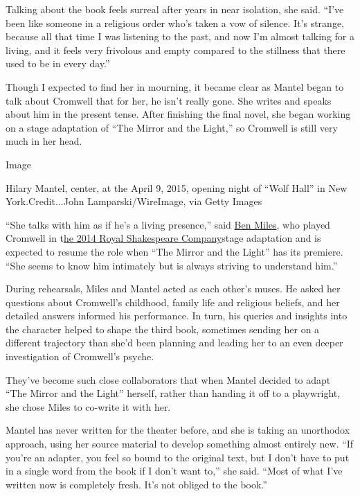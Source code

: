 Talking about the book feels surreal after years in near isolation, she
said. ``I've been like someone in a religious order who's taken a vow of
silence. It's strange, because all that time I was listening to the
past, and now I'm almost talking for a living, and it feels very
frivolous and empty compared to the stillness that there used to be in
every day.''

Though I expected to find her in mourning, it became clear as Mantel
began to talk about Cromwell that for her, he isn't really gone. She
writes and speaks about him in the present tense. After finishing the
final novel, she began working on a stage adaptation of ``The Mirror and
the Light,'' so Cromwell is still very much in her head.

Image

Hilary Mantel, center, at the April 9, 2015, opening night of ``Wolf
Hall'' in New York.Credit...John Lamparski/WireImage, via Getty Images

``She talks with him as if he's a living presence,'' said
\href{https://www.nytimes3xbfgragh.onion/2015/03/22/theater/ben-miles-takes-on-wolf-hall-onstage.html}{Ben
Miles}, who played Cromwell in
t\href{https://www.nytimes3xbfgragh.onion/2014/01/05/theater/wolf-hall-and-bring-up-the-bodies-head-for-the-stage.html}{he
2014 Royal Shakespeare Company}stage adaptation and is expected to
resume the role when ``The Mirror and the Light'' has its premiere.
``She seems to know him intimately but is always striving to understand
him.''

During rehearsals, Miles and Mantel acted as each other's muses. He
asked her questions about Cromwell's childhood, family life and
religious beliefs, and her detailed answers informed his performance. In
turn, his queries and insights into the character helped to shape the
third book, sometimes sending her on a different trajectory than she'd
been planning and leading her to an even deeper investigation of
Cromwell's psyche.

They've become such close collaborators that when Mantel decided to
adapt ``The Mirror and the Light'' herself, rather than handing it off
to a playwright, she chose Miles to co-write it with her.

Mantel has never written for the theater before, and she is taking an
unorthodox approach, using her source material to develop something
almost entirely new. ``If you're an adapter, you feel so bound to the
original text, but I don't have to put in a single word from the book if
I don't want to,'' she said. ``Most of what I've written now is
completely fresh. It's not obliged to the book.''

